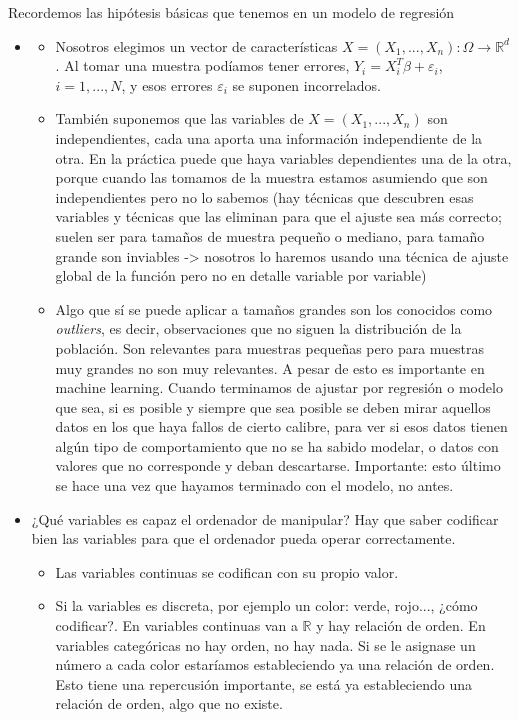 \documentclass[11pt,a4paper]{article}
\theoremstyle{definition}
\newcommand{\R}{\mathbb{R}}
\begin{document}
	Recordemos las hipótesis básicas que tenemos en un modelo de regresión
	\begin{itemize}
		\item 
		\begin{itemize}
		\item Nosotros elegimos un vector de características $X=(X_1,...,X_n)\colon \Omega \to \R^d$. Al tomar una muestra podíamos tener errores, $Y_i=X_i^T \beta + \varepsilon_i$, $i=1,...,N$, y esos errores $\varepsilon_i$ se suponen incorrelados.
		\item También suponemos que las variables de $X=(X_1,...,X_n)$ son independientes, cada una aporta una información independiente de la otra. En la práctica puede que haya variables dependientes una de la otra, porque cuando las tomamos de la muestra estamos asumiendo que son independientes pero no lo sabemos (hay técnicas que descubren esas variables y técnicas que las eliminan para que el ajuste sea más correcto; suelen ser para tamaños de muestra pequeño o mediano, para tamaño grande son inviables -> nosotros lo haremos usando una técnica de ajuste global de la función pero no en detalle variable por variable)
		\item Algo que sí se puede aplicar a tamaños grandes son los conocidos como \textit{outliers}, es decir, observaciones que no siguen la distribución de la población. Son relevantes para muestras pequeñas pero para muestras muy grandes no son muy relevantes. A pesar de esto es importante en machine learning. Cuando terminamos de ajustar por regresión o modelo que sea, si es posible y siempre que sea posible se deben mirar aquellos datos en los que haya fallos de cierto calibre, para ver si esos datos tienen algún tipo de comportamiento que no se ha sabido modelar, o datos con valores que no corresponde y deban descartarse. Importante: esto último se hace una vez que hayamos terminado con el modelo, no antes.
	\end{itemize}
	
	\item ¿Qué variables es capaz el ordenador de manipular? Hay que saber codificar bien las variables para que el ordenador pueda operar correctamente.
	\begin{itemize}
		\item Las variables continuas se codifican con su propio valor.
		\item Si la variables es discreta, por ejemplo un color: verde, rojo..., ¿cómo codificar?. En variables continuas van a $\R$ y hay relación de orden. En variables categóricas no hay orden, no hay nada. Si se le asignase un número a cada color estaríamos estableciendo ya una relación de orden. Esto tiene una repercusión importante, se está ya estableciendo una relación de orden, algo que no existe.
		

\end{itemize}
\end{itemize}
\end{document}
